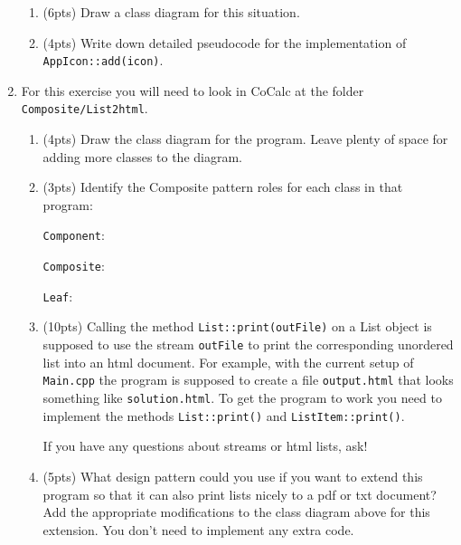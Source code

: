 \documentclass[11pt]{article}
\newlength{\up}\setlength{\up}{-\baselineskip}
\begin{document}
\begin{enumerate}
  \begin{enumerate}
    \item (6pts) Draw a class diagram for this situation.

    \vfill
    \vfill

    \item (4pts) Write down detailed pseudocode for the implementation of \texttt{AppIcon::add(icon)}. 

    \vfill

  \end{enumerate}

\newpage

  \item For this exercise you will need to look in CoCalc at the folder \texttt{Composite/List2html}.

  \begin{enumerate}

    \item (4pts) Draw the class diagram for the program. Leave plenty of space for adding more classes to the diagram.

    \vfill

    \item (3pts) Identify the Composite pattern roles for each class in that program:
    \medskip

    \texttt{Component}:
    \medskip

    \texttt{Composite}:
    \medskip

    \texttt{Leaf}:

    \item (10pts) Calling the method \texttt{List::print(outFile)} on a List object is supposed to use the stream \texttt{outFile} to print the corresponding unordered list into an html document. For example, with the current setup of \texttt{Main.cpp} the program is supposed to create a file \texttt{output.html} that looks something like \texttt{solution.html}. To get the program to work you need to implement the methods \texttt{List::print()} and \texttt{ListItem::print()}. 

    If you have any questions about streams or html lists, ask!

    \item (5pts) What design pattern could you use if you want to extend this program so that it can also print lists nicely to a pdf or txt document? Add the appropriate modifications to the class diagram above for this extension. You don't need to implement any extra code.

    \bigskip

  \end{enumerate}

\end{enumerate}
\end{document}
